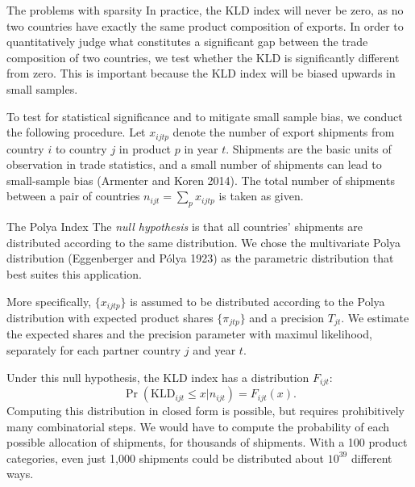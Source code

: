 \documentclass[
  ignorenonframetext,
  aspectratio=16,
]{beamer}
\begin{document}
\begin{frame}{The problems with sparsity}
\protect\hypertarget{the-problems-with-sparsity}{}
In practice, the KLD index will never be zero, as no two countries have
exactly the same product composition of exports. In order to
quantitatively judge what constitutes a significant gap between the
trade composition of two countries, we test whether the KLD is
significantly different from zero. This is important because the KLD
index will be biased upwards in small samples.

To test for statistical significance and to mitigate small sample bias,
we conduct the following procedure. Let \(x_{ijtp}\) denote the number
of export shipments from country \(i\) to country \(j\) in product \(p\)
in year \(t\). Shipments are the basic units of observation in trade
statistics, and a small number of shipments can lead to small-sample
bias (Armenter and Koren 2014). The total number of shipments between a
pair of countries \(n_{ijt} = \sum_p x_{ijtp}\) is taken as given.
\end{frame}

\begin{frame}{The Polya Index}
\protect\hypertarget{the-polya-index}{}
The \emph{null hypothesis} is that all countries' shipments are
distributed according to the same distribution. We chose the
multivariate Polya distribution (Eggenberger and Pólya 1923) as the
parametric distribution that best suites this application.

More specifically, \(\{x_{ijtp}\}\) is assumed to be distributed
according to the Polya distribution with expected product shares
\(\{\pi_{jtp}\}\) and a precision \(T_{jt}\). We estimate the expected
shares and the precision parameter with maximul likelihood, separately
for each partner country \(j\) and year \(t\).

Under this null hypothesis, the KLD index has a distribution
\(F_{ijt}\): \begin{equation}
    \Pr(\text{KLD}_{ijt} \le x | n_{ijt}) = F_{ijt}(x).
\end{equation} Computing this distribution in closed form is possible,
but requires prohibitively many combinatorial steps. We would have to
compute the probability of each possible allocation of shipments, for
thousands of shipments. With a 100 product categories, even just 1,000
shipments could be distributed about \(10^{39}\) different ways.
\end{frame}
\end{document}
